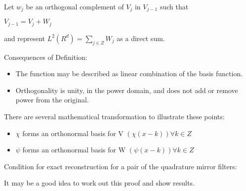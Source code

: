 \documentclass{article}
\begin{document}
Let $w_j$ be an orthogonal complement of $V_j$ in $V_{j-1}$ such that

$V_{j-1} = V_j +W_j$

and represent $L^2(R^d)= \sum _{j\in Z} W_j $  as a direct sum.

Consequences of Definition:
\begin{itemize}
\item The function may be described as linear combination of the basis function.
\item Orthogonality is unity, in the power domain, and does not add or remove
power from the original.  
\end {itemize} 

There are several mathematical transformation to illustrate these points:
\begin{itemize}
\item $\chi$ forms an orthonormal basis for V $(\chi (x-k)) \forall k \in Z$
\item $\psi$ forms an orthonormal basis for W $(\psi (x-k)) \forall k \in Z$

\end{itemize}

Condition for exact reconstruction for a pair of the quadrature mirror filters:

It may be a good idea to work out this proof and show results.  
\end{document}

